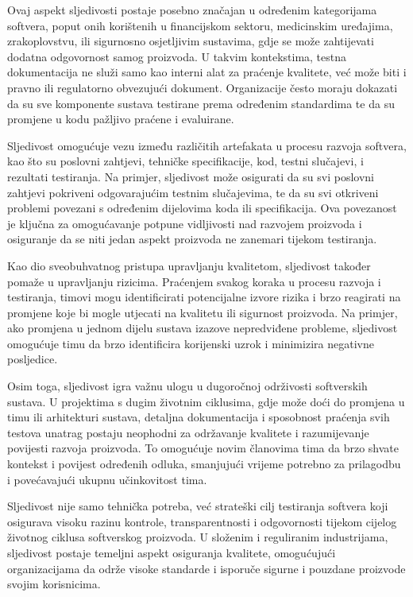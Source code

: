 Ovaj aspekt sljedivosti postaje posebno značajan u određenim kategorijama softvera, poput onih korištenih u financijskom sektoru, medicinskim uređajima, zrakoplovstvu, ili sigurnosno osjetljivim sustavima, gdje se može zahtijevati dodatna odgovornost samog proizvoda.
U takvim kontekstima, testna dokumentacija ne služi samo kao interni alat za praćenje kvalitete, već može biti i pravno ili regulatorno obvezujući dokument.
Organizacije često moraju dokazati da su sve komponente sustava testirane prema određenim standardima te da su promjene u kodu pažljivo praćene i evaluirane.

Sljedivost omogućuje vezu između različitih artefakata u procesu razvoja softvera, kao što su poslovni zahtjevi, tehničke specifikacije, kod, testni slučajevi, i rezultati testiranja.
Na primjer, sljedivost može osigurati da su svi poslovni zahtjevi pokriveni odgovarajućim testnim slučajevima, te da su svi otkriveni problemi povezani s određenim dijelovima koda ili specifikacija.
Ova povezanost je ključna za omogućavanje potpune vidljivosti nad razvojem proizvoda i osiguranje da se niti jedan aspekt proizvoda ne zanemari tijekom testiranja.

Kao dio sveobuhvatnog pristupa upravljanju kvalitetom, sljedivost također pomaže u upravljanju rizicima.
Praćenjem svakog koraka u procesu razvoja i testiranja, timovi mogu identificirati potencijalne izvore rizika i brzo reagirati na promjene koje bi mogle utjecati na kvalitetu ili sigurnost proizvoda.
Na primjer, ako promjena u jednom dijelu sustava izazove nepredviđene probleme, sljedivost omogućuje timu da brzo identificira korijenski uzrok i minimizira negativne posljedice.

Osim toga, sljedivost igra važnu ulogu u dugoročnoj održivosti softverskih sustava.
U projektima s dugim životnim ciklusima, gdje može doći do promjena u timu ili arhitekturi sustava, detaljna dokumentacija i sposobnost praćenja svih testova unatrag postaju neophodni za održavanje kvalitete i razumijevanje povijesti razvoja proizvoda.
To omogućuje novim članovima tima da brzo shvate kontekst i povijest određenih odluka, smanjujući vrijeme potrebno za prilagodbu i povećavajući ukupnu učinkovitost tima.

Sljedivost nije samo tehnička potreba, već strateški cilj testiranja softvera koji osigurava visoku razinu kontrole, transparentnosti i odgovornosti tijekom cijelog životnog ciklusa softverskog proizvoda.
U složenim i reguliranim industrijama, sljedivost postaje temeljni aspekt osiguranja kvalitete, omogućujući organizacijama da održe visoke standarde i isporuče sigurne i pouzdane proizvode svojim korisnicima. \cite{quadri2010software}

